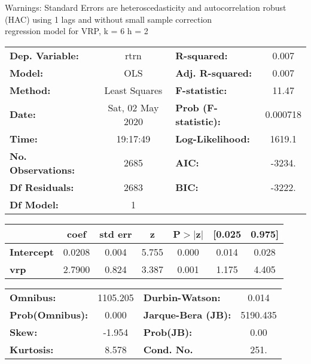 Warnings: \newline
 [1] Standard Errors are heteroscedasticity and autocorrelation robust (HAC) using 1 lags and without small sample correction\\ 

regression model for VRP, k = 6 h = 2\begin{center}
\begin{tabular}{lclc}
\toprule
\textbf{Dep. Variable:}    &       rtrn       & \textbf{  R-squared:         } &     0.007   \\
\textbf{Model:}            &       OLS        & \textbf{  Adj. R-squared:    } &     0.007   \\
\textbf{Method:}           &  Least Squares   & \textbf{  F-statistic:       } &     11.47   \\
\textbf{Date:}             & Sat, 02 May 2020 & \textbf{  Prob (F-statistic):} &  0.000718   \\
\textbf{Time:}             &     19:17:49     & \textbf{  Log-Likelihood:    } &    1619.1   \\
\textbf{No. Observations:} &        2685      & \textbf{  AIC:               } &    -3234.   \\
\textbf{Df Residuals:}     &        2683      & \textbf{  BIC:               } &    -3222.   \\
\textbf{Df Model:}         &           1      & \textbf{                     } &             \\
\bottomrule
\end{tabular}
\begin{tabular}{lcccccc}
                   & \textbf{coef} & \textbf{std err} & \textbf{z} & \textbf{P$> |$z$|$} & \textbf{[0.025} & \textbf{0.975]}  \\
\midrule
\textbf{Intercept} &       0.0208  &        0.004     &     5.755  &         0.000        &        0.014    &        0.028     \\
\textbf{vrp}       &       2.7900  &        0.824     &     3.387  &         0.001        &        1.175    &        4.405     \\
\bottomrule
\end{tabular}
\begin{tabular}{lclc}
\textbf{Omnibus:}       & 1105.205 & \textbf{  Durbin-Watson:     } &    0.014  \\
\textbf{Prob(Omnibus):} &   0.000  & \textbf{  Jarque-Bera (JB):  } & 5190.435  \\
\textbf{Skew:}          &  -1.954  & \textbf{  Prob(JB):          } &     0.00  \\
\textbf{Kurtosis:}      &   8.578  & \textbf{  Cond. No.          } &     251.  \\
\bottomrule
\end{tabular}
\end{center}

